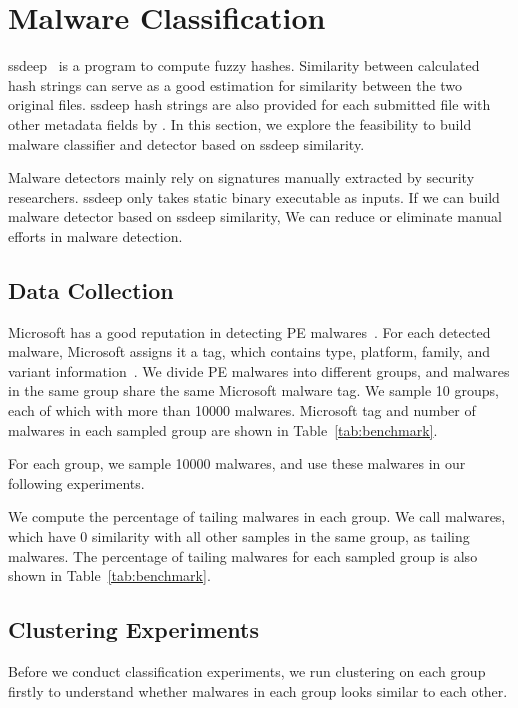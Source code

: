 \section{Malware Classification}
\label{sec:ssdeep}

ssdeep~\cite{ssdeep} is a program to compute fuzzy hashes. 
Similarity between calculated hash strings can serve as a good estimation for similarity between the two original files. 
ssdeep hash strings are also provided for each submitted file with other metadata fields by \vt. 
In this section, we explore the feasibility to build malware classifier and detector based on ssdeep similarity. 

Malware detectors mainly rely on signatures manually extracted by security researchers. 
ssdeep only takes static binary executable as inputs. 
If we can build malware detector based on ssdeep similarity, 
We can reduce or eliminate manual efforts in malware detection. 

\subsection{Data Collection}



Microsoft has a good reputation in detecting PE malwares~\cite{SongAPsys2016}.
For each detected malware, Microsoft assigns it a tag, which contains type, platform, family, and variant information~\cite{microsoft}. 
We divide PE malwares into different groups, and malwares in the same group share the same Microsoft malware tag. 
We sample 10 groups, each of which with more than 10000 malwares.  
Microsoft tag and number of malwares in each sampled group are shown in Table~\ref{tab:benchmark}.

For each group, we sample 10000 malwares, and use these malwares in our following experiments. 

We compute the percentage of tailing malwares in each group. 
We call malwares, which have 0 similarity with all other samples in the same group, as tailing malwares. 
The percentage of tailing malwares for each sampled group is also shown in Table~\ref{tab:benchmark}. 

\subsection{Clustering Experiments}



Before we conduct classification experiments, 
we run clustering on each group firstly to understand whether malwares in each group looks similar to each other. 

